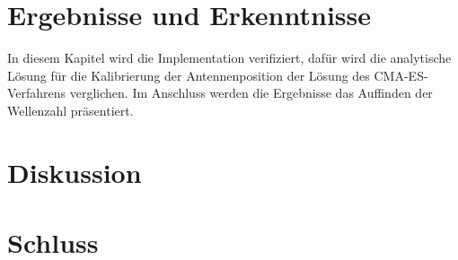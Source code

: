 \documentclass[a4paper,12pt,fleqn]{scrbook}
\begin{document}
\chapter{Ergebnisse und Erkenntnisse}
In diesem Kapitel wird die Implementation verifiziert, dafür wird die analytische Lösung für die Kalibrierung der Antennenposition der Lösung des CMA-ES-Verfahrens verglichen. Im Anschluss werden die Ergebnisse das Auffinden der Wellenzahl präsentiert.
%

%
\chapter{Diskussion}
\lipsum[1]

%
\chapter{Schluss}
\lipsum[1]

%


\newpage

\nocite{*} %


\end{document}
